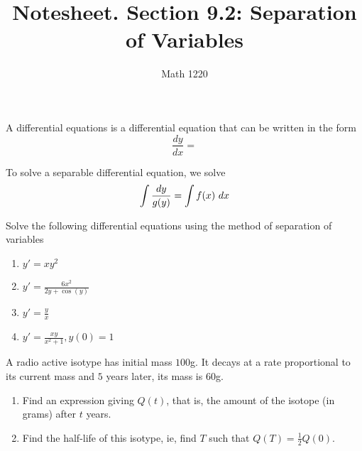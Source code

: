 \documentclass[12pt, a4paper]{article}
\author{Math 1220}
\title{Notesheet. Section 9.2: Separation of Variables}
\date{}
\begin{document}
\maketitle
\nameline
\begin{defi}
  A  differential equations is a differential equation
  that can be written in the form \[
    \frac{dy}{dx} = 
  \]
\end{defi}
\begin{thrm}
  To solve a separable differential equation, we solve \[
    \int \frac{dy}{g(y)} = \int f(x)\ d x
  \]
\end{thrm}
\begin{ex}
  Solve the following differential equations using the method of
  separation of variables
  \begin{enumerate}
  \item \(y'=xy^2\)
    \vspace{2in}
  \item \(y' = \frac{6x^2}{2y+\cos(y)}\)
    \vspace{2in}
  \item \(y'=\frac{y}{x}\)
    \vspace{2in}
  \item \(y' = \frac{xy}{x^2+1}, y(0)=1\)
  \end{enumerate}
\end{ex}
\vspace{1in}
\begin{ex}
  A radio active isotype has initial mass \(100\)g. It decays at a
  rate proportional to its current mass and \(5\) years later, its
  mass is \(60\)g.
  \begin{enumerate}
  \item Find an expression giving \(Q(t)\), that is, the amount of the
    isotope (in grams) after \(t\) years.
  \item Find the half-life of this isotype, ie, find \(T\) such that
    \(Q(T) = \frac{1}{2}Q(0)\).
  \end{enumerate}
\end{ex}
\end{document}
